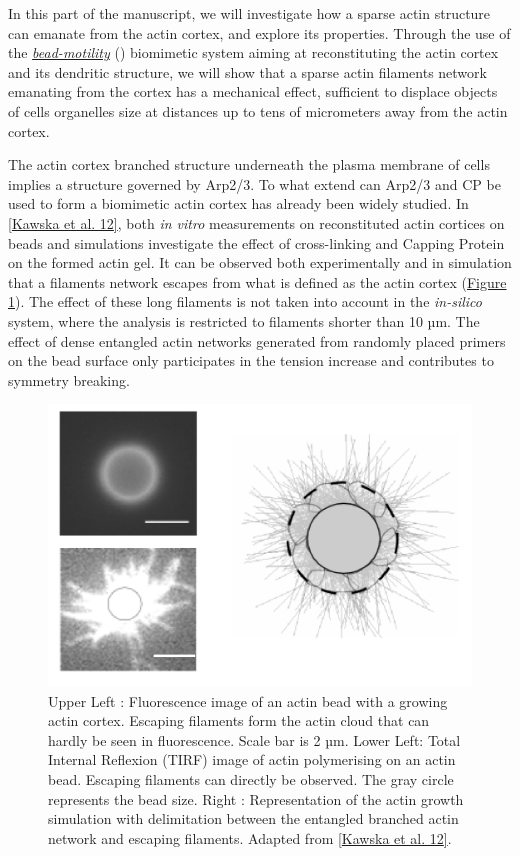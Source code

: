 \documentclass[A4paperpaper,11pt,english]{sphinxmanual}
\begin{document}
In this part of the manuscript, we will investigate how a sparse actin structure can
emanate from the actin cortex, and explore its properties. Through the use of the
{\hyperref[index-latex:bead-motility-assay]{\emph{bead-motility}}} () biomimetic system aiming at reconstituting
the actin cortex and its dendritic structure, we will show that a sparse actin filaments network
emanating from the cortex has a mechanical effect, sufficient to
displace objects of cells organelles size at distances up to tens of micrometers
away from the actin cortex.

The actin cortex branched structure underneath the plasma membrane of
cells implies a structure governed by Arp2/3. To what extend can Arp2/3 and CP be used
to form a biomimetic actin cortex has already been widely studied. In
{\hyperref[index-latex:kawska2012]{{[}Kawska et al. 12{]}}}, both \emph{in vitro} measurements on reconstituted actin cortices
on beads and simulations investigate the effect of cross-linking and
Capping Protein on the formed actin gel. It can be observed both experimentally and in
simulation that a filaments network escapes from what is defined as the actin
cortex (\hyperref[index-latex:fig-bead-tirf]{Figure  \ref*{index-latex:fig-bead-tirf}}). The effect of these long filaments is not taken into account in the
\emph{in-silico} system, where the analysis is restricted to filaments shorter than 10
µm. The effect of dense entangled actin networks generated from
randomly placed primers on the bead surface only participates in the tension increase and
contributes to symmetry breaking.
\begin{figure}[htbp]
\centering
\capstart

\includegraphics[width=0.700\linewidth]{Bead-tirf-fluo-sim.png}
\caption{Upper Left : Fluorescence image of an actin bead with a growing actin
cortex. Escaping filaments form the actin cloud that can  hardly  be seen
in fluorescence. Scale bar is 2 µm. Lower Left: Total Internal Reflexion
(TIRF) image of actin polymerising on an actin bead. Escaping filaments can
directly be observed. The gray circle represents the bead size.  Right :
Representation of the actin growth simulation with delimitation between the
entangled branched actin network and escaping filaments.  Adapted from
{\hyperref[index-latex:kawska2012]{{[}Kawska et al. 12{]}}}.}\label{index-latex:fig-bead-tirf}\end{figure}
\end{document}

